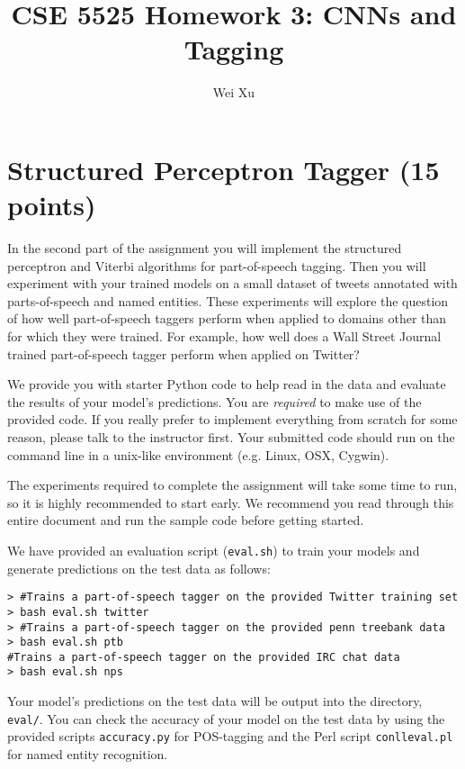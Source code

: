 \documentclass[12pt, letterpaper]{article}
\begin{document}
\title{CSE 5525 Homework 3: CNNs and Tagging}
\author{Wei Xu}
\date{}
\maketitle


\section{Structured Perceptron Tagger (15 points)}
In the second part of the assignment you will implement the structured perceptron and Viterbi algorithms for part-of-speech
tagging.  Then you will experiment with your trained models on a small dataset of
tweets annotated with parts-of-speech and named entities.  These experiments will explore the question of how well part-of-speech taggers perform when applied to domains other than for which they were trained.  For example,
how well does a Wall Street Journal trained part-of-speech tagger perform when applied on Twitter?

We provide you with starter Python code to help read in the data and evaluate the results of your model's predictions.
You are \emph{required} to make use of the provided code.  
If you really prefer to implement everything from scratch for some reason, please talk to the instructor first.  Your submitted code
should run on the command line in a unix-like environment (e.g. Linux, OSX, Cygwin).

The experiments required to complete the assignment will take some
time to run, so it is highly recommended to start early.  We recommend you read through this entire document and
run the sample code before getting started.

We have provided an evaluation script ({\tt eval.sh}) to train your models and generate predictions on the test data as follows:
\begin{small}
\begin{verbatim}
> #Trains a part-of-speech tagger on the provided Twitter training set
> bash eval.sh twitter
> #Trains a part-of-speech tagger on the provided penn treebank data
> bash eval.sh ptb       
#Trains a part-of-speech tagger on the provided IRC chat data
> bash eval.sh nps          
\end{verbatim}
\end{small}

Your model's predictions on the test data will be output into the directory, {\tt eval/}.
You can check the accuracy of your model on the test data by using the provided scripts
{\tt accuracy.py} for POS-tagging and the Perl script {\tt conlleval.pl} for named entity
recognition.
\end{document}
